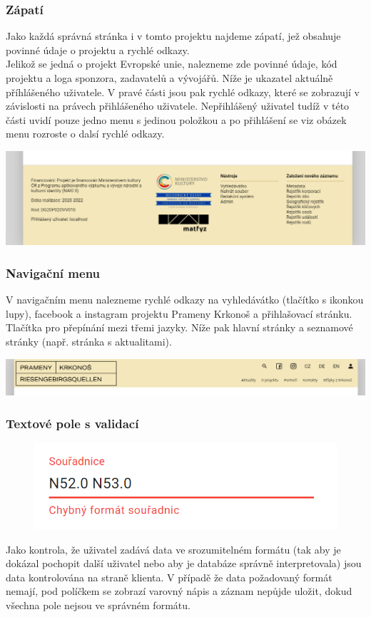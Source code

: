 \subsubsection{Zápatí}
Jako každá správná stránka i v tomto projektu najdeme zápatí, jež obsahuje povinné údaje o projektu a
rychlé odkazy.\\
Jelikož se jedná o projekt Evropské unie, nalezneme zde povinné údaje, kód projektu a
loga sponzora, zadavatelů a vývojářů.
Níže je ukazatel aktuálně příhlášeného uživatele.
V pravé části jsou pak rychlé odkazy, které se zobrazují v závislosti na právech přihlášeného uživatele.
Nepřihlášený uživatel tudíž v této části uvidí pouze jedno menu  s jedinou
položkou  a po přihlášení se viz obázek menu rozroste o dalsí rychlé odkazy.
\begin{center}
	\includegraphics[width=.8\textwidth]{img/zapati.png}
\end{center}

\subsubsection{Navigační menu}
V navigačním menu nalezneme rychlé odkazy na vyhledávátko (tlačítko s ikonkou lupy),
facebook a instagram projektu Prameny Krkonoš a přihlašovací stránku. Tlačítka pro
přepínání mezi třemi jazyky. Níže pak hlavní stránky a seznamové stránky (např. stránka s aktualitami).
\begin{center}
	\includegraphics[width=.8\textwidth]{img/navigationBar.png}
\end{center}

\subsubsection{Textové pole s validací}
\begin{figure}
	\centering
	\includegraphics[width=\linewidth]{img/validationField.png}
\end{figure}
Jako kontrola, že uživatel zadává data ve srozumitelném formátu (tak aby je dokázal pochopit další
uživatel nebo aby je databáze správně interpretovala) jsou data kontrolována na straně klienta.
V případě že data požadovaný formát nemají, pod políčkem se zobrazí varovný nápis a
záznam nepůjde uložit, dokud všechna pole nejsou ve správném formátu.

